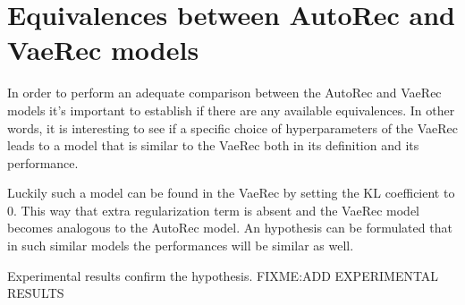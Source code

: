 \section{Equivalences between AutoRec and VaeRec models}

In order to perform an adequate comparison between the AutoRec and VaeRec
models it's important to establish if there are any available equivalences.
In other words, it is interesting to see if a specific choice of hyperparameters
of the VaeRec leads to a model that is similar to the VaeRec both in its definition
and its performance.

Luckily such a model can be found in the VaeRec by setting the KL coefficient to 0.
This way that extra regularization term is absent and the VaeRec model becomes analogous
to the AutoRec model. An hypothesis can be formulated that in such similar models
the performances will be similar as well.

Experimental results confirm the hypothesis. FIXME:ADD EXPERIMENTAL RESULTS
